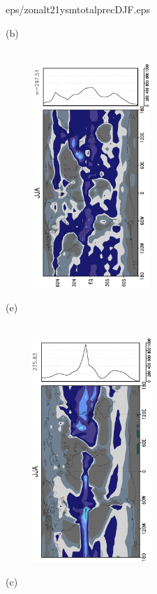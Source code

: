 \documentclass[12pt,a4paper,twoside,openright,headinclude,liststotoc,bibtotoc]{scrreprt}
\begin{document}
\begin{figure}[H]
{{eps/zonalt21ysmtotalprecDJF.eps}
}
\parbox{8.5cm}{\hspace{0.50cm}\begin{scriptsize}(b)\end{scriptsize} \vspace{-0.7cm} \\
\includegraphics[height=8.5cm,width=6.5cm,angle=-90]
{eps/zonalysmtotalprec260JJA.eps}
}
\parbox{8.5cm}{\hspace{0.28cm}\begin{scriptsize}(e)\end{scriptsize} \vspace{-0.7cm} \\
\includegraphics[height=8.5cm,width=6.5cm,angle=-90]
{eps/zonalt21ysmtotalprecJJA.eps}
}
\parbox{8.4cm}{\hspace{0.50cm}\begin{scriptsize}(c)\end{scriptsize} \vspace{-0.7cm} \\
}
\end{figure}
\end{document}

